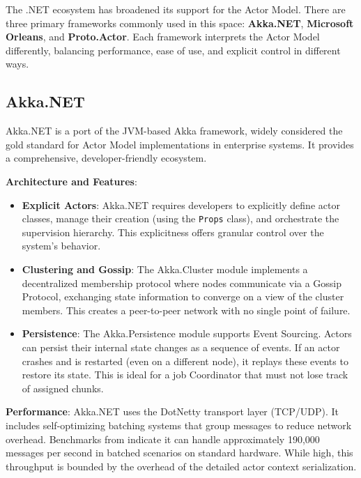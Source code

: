 The .NET ecosystem has broadened its support for the Actor Model. There are three primary frameworks commonly used in this space: \textbf{Akka.NET}, \textbf{Microsoft Orleans}, and \textbf{Proto.Actor}. Each framework interprets the Actor Model differently, balancing performance, ease of use, and explicit control in different ways.

\subsection{Akka.NET}

Akka.NET is a port of the JVM-based Akka framework, widely considered the gold standard for Actor Model implementations in enterprise systems. It provides a comprehensive, developer-friendly ecosystem.

\textbf{Architecture and Features}:

\begin{itemize}
    \item \textbf{Explicit Actors}: Akka.NET requires developers to explicitly define actor classes, manage their creation (using the \verb|Props| class), and orchestrate the supervision hierarchy. This explicitness offers granular control over the system's behavior.

    \item \textbf{Clustering and Gossip}: The Akka.Cluster module \cite{akka_cluster} implements a decentralized membership protocol where nodes communicate via a Gossip Protocol, exchanging state information to converge on a view of the cluster members. This creates a peer-to-peer network with no single point of failure.

    \item \textbf{Persistence}: The Akka.Persistence module \cite{akka_persistance} supports Event Sourcing. Actors can persist their internal state changes as a sequence of events. If an actor crashes and is restarted (even on a different node), it replays these events to restore its state. This is ideal for a job Coordinator that must not lose track of assigned chunks.
\end{itemize}

\textbf{Performance}: Akka.NET uses the DotNetty transport layer (TCP/UDP). It includes self-optimizing batching systems that group messages to reduce network overhead. Benchmarks from \cite{akka_performance} indicate it can handle approximately 190,000 messages per second in batched scenarios on standard hardware. While high, this throughput is bounded by the overhead of the detailed actor context serialization.

